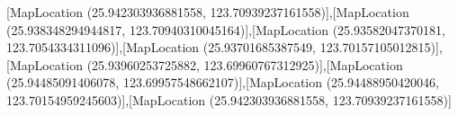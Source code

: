 [MapLocation (25.942303936881558, 123.70939237161558)],[MapLocation (25.938348294944817, 123.70940310045164)],[MapLocation (25.93582047370181, 123.7054334311096)],[MapLocation (25.93701685387549, 123.70157105012815)],[MapLocation (25.93960253725882, 123.69960767312925)],[MapLocation (25.94485091406078, 123.69957548662107)],[MapLocation (25.94488950420046, 123.70154959245603)],[MapLocation (25.942303936881558, 123.70939237161558)]